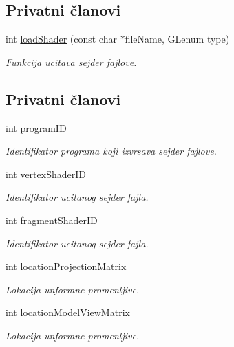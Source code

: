 \subsection*{Privatni članovi}
\begin{DoxyCompactItemize}
\item 
int \hyperlink{classshader_1_1ParticleShader_a444f88cdbece44ab06d85f252e687002}{load\+Shader} (const char $\ast$file\+Name, G\+Lenum type)
\begin{DoxyCompactList}\small\item\em Funkcija ucitava sejder fajlove. \end{DoxyCompactList}\end{DoxyCompactItemize}
\subsection*{Privatni članovi}
\begin{DoxyCompactItemize}
\item 
int \hyperlink{classshader_1_1ParticleShader_a885fd3acfd60fc4567406bb9f2c6e19c}{program\+ID}
\begin{DoxyCompactList}\small\item\em Identifikator programa koji izvrsava sejder fajlove. \end{DoxyCompactList}\item 
int \hyperlink{classshader_1_1ParticleShader_a7d53e05df70426b6d6c46fa29685be6d}{vertex\+Shader\+ID}
\begin{DoxyCompactList}\small\item\em Identifikator ucitanog sejder fajla. \end{DoxyCompactList}\item 
int \hyperlink{classshader_1_1ParticleShader_abcf4d0fd142fec4ba55985a8c41ccb3e}{fragment\+Shader\+ID}
\begin{DoxyCompactList}\small\item\em Identifikator ucitanog sejder fajla. \end{DoxyCompactList}\item 
int \hyperlink{classshader_1_1ParticleShader_aeb1444ce911084eaf1c1d1288afa133a}{location\+Projection\+Matrix}
\begin{DoxyCompactList}\small\item\em Lokacija unformne promenljive. \end{DoxyCompactList}\item 
int \hyperlink{classshader_1_1ParticleShader_ae69d7963f488f78569cf5ffb12a484fb}{location\+Model\+View\+Matrix}
\begin{DoxyCompactList}\small\item\em Lokacija unformne promenljive. \end{DoxyCompactList}\end{DoxyCompactItemize}


